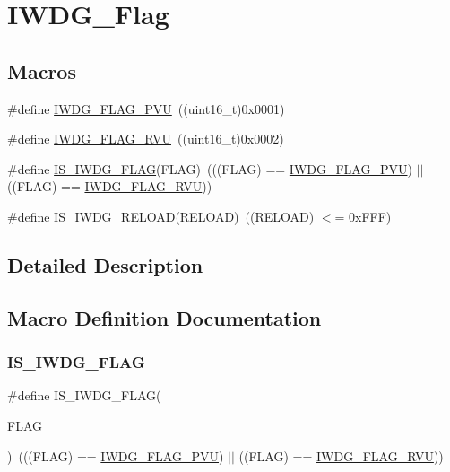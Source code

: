 \hypertarget{group___i_w_d_g___flag}{}\section{I\+W\+D\+G\+\_\+\+Flag}
\label{group___i_w_d_g___flag}
\subsection*{Macros}
\begin{DoxyCompactItemize}
\item 
\#define \mbox{\hyperlink{group___i_w_d_g___flag_gae20afcf399fad1534e79a8d30ea86c9c}{I\+W\+D\+G\+\_\+\+F\+L\+A\+G\+\_\+\+P\+VU}}~((uint16\+\_\+t)0x0001)
\item 
\#define \mbox{\hyperlink{group___i_w_d_g___flag_ga3731bf2711c234ffe5b405fb6634ebca}{I\+W\+D\+G\+\_\+\+F\+L\+A\+G\+\_\+\+R\+VU}}~((uint16\+\_\+t)0x0002)
\item 
\#define \mbox{\hyperlink{group___i_w_d_g___flag_ga5be9ae9ba267cf09a00523ef3e219293}{I\+S\+\_\+\+I\+W\+D\+G\+\_\+\+F\+L\+AG}}(F\+L\+AG)~(((F\+L\+AG) == \mbox{\hyperlink{group___i_w_d_g___flag_gae20afcf399fad1534e79a8d30ea86c9c}{I\+W\+D\+G\+\_\+\+F\+L\+A\+G\+\_\+\+P\+VU}}) $\vert$$\vert$ ((F\+L\+AG) == \mbox{\hyperlink{group___i_w_d_g___flag_ga3731bf2711c234ffe5b405fb6634ebca}{I\+W\+D\+G\+\_\+\+F\+L\+A\+G\+\_\+\+R\+VU}}))
\item 
\#define \mbox{\hyperlink{group___i_w_d_g___flag_ga7c319e96bded8e3c38c6a42a1b335c68}{I\+S\+\_\+\+I\+W\+D\+G\+\_\+\+R\+E\+L\+O\+AD}}(R\+E\+L\+O\+AD)~((R\+E\+L\+O\+AD) $<$= 0x\+F\+F\+F)
\end{DoxyCompactItemize}


\subsection{Detailed Description}


\subsection{Macro Definition Documentation}
\mbox{\label{group___i_w_d_g___flag_ga5be9ae9ba267cf09a00523ef3e219293}} 
\subsubsection{\texorpdfstring{IS\_IWDG\_FLAG}{IS\_IWDG\_FLAG}}
{\footnotesize\ttfamily \#define I\+S\+\_\+\+I\+W\+D\+G\+\_\+\+F\+L\+AG(\begin{DoxyParamCaption}\item[{}]{F\+L\+AG }\end{DoxyParamCaption})~(((F\+L\+AG) == \mbox{\hyperlink{group___i_w_d_g___flag_gae20afcf399fad1534e79a8d30ea86c9c}{I\+W\+D\+G\+\_\+\+F\+L\+A\+G\+\_\+\+P\+VU}}) $\vert$$\vert$ ((F\+L\+AG) == \mbox{\hyperlink{group___i_w_d_g___flag_ga3731bf2711c234ffe5b405fb6634ebca}{I\+W\+D\+G\+\_\+\+F\+L\+A\+G\+\_\+\+R\+VU}}))}

